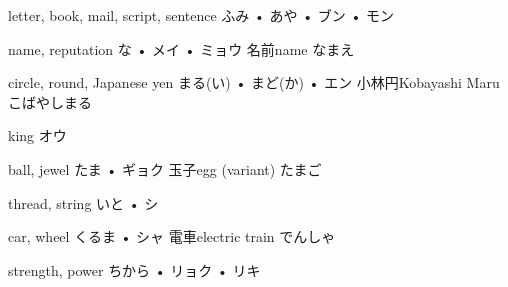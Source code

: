 



\setcounter{cardnum}{73}

		{letter, book, mail, script, sentence}
		{ふみ • あや • ブン • モン}
		{}{}
		{}{}
		{}{}
		{}{}
		{}{}

		{name, reputation}
		{な • メイ • ミョウ}
		{名前}{name なまえ}
		{}{}
		{}{}
		{}{}
		{}{}

		{circle, round, Japanese yen}
		{まる(い) • まど(か) • エン}
		{小林円}{Kobayashi Maru こばやしまる}
		{}{}
		{}{}
		{}{}
		{}{}

		{king}
		{オウ}
		{}{}
		{}{}
		{}{}
		{}{}
		{}{}

		{ball, jewel}
		{たま • ギョク}
		{玉子}{egg (variant) たまご}
		{}{}
		{}{}
		{}{}
		{}{}

		{thread, string}
		{いと • シ}
		{}{}
		{}{}
		{}{}
		{}{}
		{}{}

		{car, wheel}
		{くるま • シャ}
		{電車}{electric train でんしゃ}
		{}{}
		{}{}
		{}{}
		{}{}

		{strength, power}
		{ちから • リョク • リキ}
		{}{}
		{}{}
		{}{}
		{}{}
		{}{}

